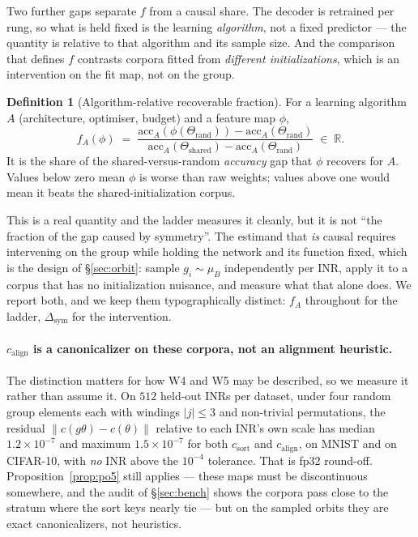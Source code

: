\documentclass[10pt,letterpaper]{article}
\theoremstyle{definition}
\newtheorem{definition}[theorem]{Definition}
\newcommand{\R}{\mathbb{R}}
\newcommand{\csort}{c_{\mathrm{sort}}}
\newcommand{\calign}{c_{\mathrm{align}}}
\begin{document}
Two further gaps separate $f$ from a causal share. The decoder is retrained per rung, so what is
held fixed is the learning \emph{algorithm}, not a fixed predictor --- the quantity is relative to
that algorithm and its sample size. And the comparison that defines $f$ contrasts corpora fitted
from \emph{different initializations}, which is an intervention on the fit map, not on the group.

\begin{definition}[Algorithm-relative recoverable fraction]\label{def:f}
For a learning algorithm $A$ (architecture, optimiser, budget) and a feature map $\phi$,
\begin{equation}
f_A(\phi) \;=\; \frac{\mathrm{acc}_A(\phi(\Theta_{\mathrm{rand}})) - \mathrm{acc}_A(\Theta_{\mathrm{rand}})}
{\mathrm{acc}_A(\Theta_{\mathrm{shared}}) - \mathrm{acc}_A(\Theta_{\mathrm{rand}})} \;\in\; \R .
\end{equation}
It is the share of the shared-versus-random \emph{accuracy} gap that $\phi$ recovers for $A$.
Values below zero mean $\phi$ is worse than raw weights; values above one would mean it beats the
shared-initialization corpus.
\end{definition}

This is a real quantity and the ladder measures it cleanly, but it is not ``the fraction of the gap
caused by symmetry''. The estimand that \emph{is} causal requires intervening on the group while
holding the network and its function fixed, which is the design of \S\ref{sec:orbit}: sample
$g_i \sim \mu_B$ independently per INR, apply it to a corpus that has no initialization nuisance,
and measure what that alone does. We report both, and we keep them typographically distinct: $f_A$
throughout for the ladder, $\Delta_{\mathrm{sym}}$ for the intervention.

\paragraph{$\calign$ is a canonicalizer on these corpora, not an alignment heuristic.} The
distinction matters for how W4 and W5 may be described, so we measure it rather than assume it. On
$512$ held-out INRs per dataset, under four random group elements each with windings $|j|\le3$ and
non-trivial permutations, the residual $\|c(g\theta) - c(\theta)\|$ relative to each INR's own scale
has median $1.2\times10^{-7}$ and maximum $1.5\times10^{-7}$ for both $\csort$ and $\calign$, on
MNIST and on CIFAR-10, with \emph{no} INR above the $10^{-4}$ tolerance. That is fp32 round-off.
Proposition~\ref{prop:po5} still applies --- these maps must be discontinuous somewhere, and the
audit of \S\ref{sec:bench} shows the corpora pass close to the stratum where the sort keys nearly
tie --- but on the sampled orbits they are exact canonicalizers, not heuristics.
\end{document}
